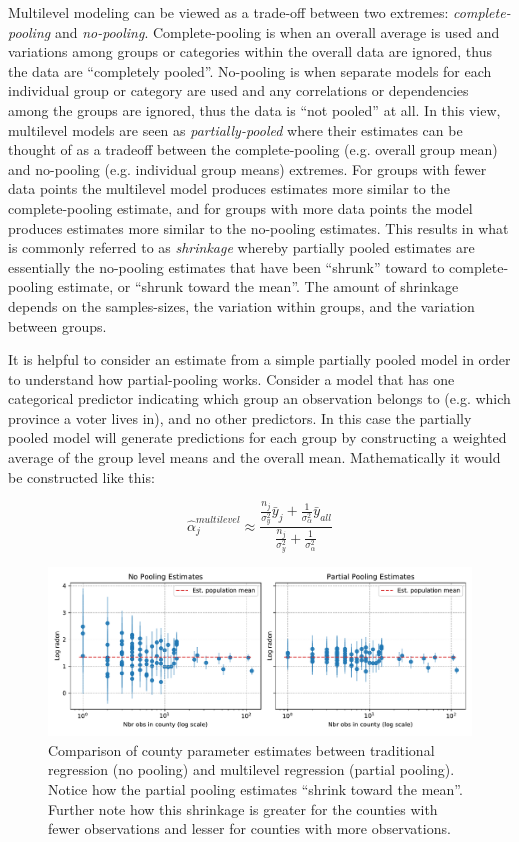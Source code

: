 Multilevel modeling can be viewed as a trade-off between two extremes: \textit{complete-pooling} and \textit{no-pooling}. Complete-pooling is when an overall average is used and variations among groups or categories within the overall data are ignored, thus the data are ``completely pooled''. No-pooling is when separate models for each individual group or category are used and any correlations or dependencies among the groups are ignored, thus the data is ``not pooled'' at all. In this view, multilevel models are seen as \textit{partially-pooled} where their estimates can be thought of as a tradeoff between the complete-pooling (e.g. overall group mean) and no-pooling (e.g. individual group means) extremes. For groups with fewer data points the multilevel model produces estimates more similar to the complete-pooling estimate, and for groups with more data points the model produces estimates more similar to the no-pooling estimates. This results in what is commonly referred to as \textit{shrinkage} whereby partially pooled estimates are essentially the no-pooling estimates that have been “shrunk” toward to complete-pooling estimate, or ``shrunk toward the mean''. The amount of shrinkage depends on the samples-sizes, the variation within groups, and the variation between groups.

It is helpful to consider an estimate from a simple partially pooled model in order to understand how partial-pooling works. Consider a model that has one categorical predictor indicating which group an observation belongs to (e.g. which province a voter lives in), and no other predictors. In this case the partially pooled model will generate predictions for each group by constructing a weighted average of the group level means and the overall mean. Mathematically it would be constructed like this:

\begin{equation} \label{eq:mlm_ex}
\hat{\alpha}_j^{multilevel} \approx \frac{ \frac{n_j}{\sigma_y^2} \bar{y}_j + \frac{1}{\sigma_{\alpha}^2} \bar{y}_{all} }{ \frac{n_j}{\sigma_y^2} + \frac{1}{\sigma_{\alpha}^2} }
\end{equation}

\begin{figure}
	\centering
	\includegraphics[width=\textwidth]{figures/radon_example.pdf}
	\caption{Comparison of county parameter estimates between traditional regression (no pooling) and multilevel regression (partial pooling). Notice how the partial pooling estimates ``shrink toward the mean''. Further note how this shrinkage is greater for the counties with fewer observations and lesser for counties with more observations.}
	\label{fig:radon_example}
\end{figure}

